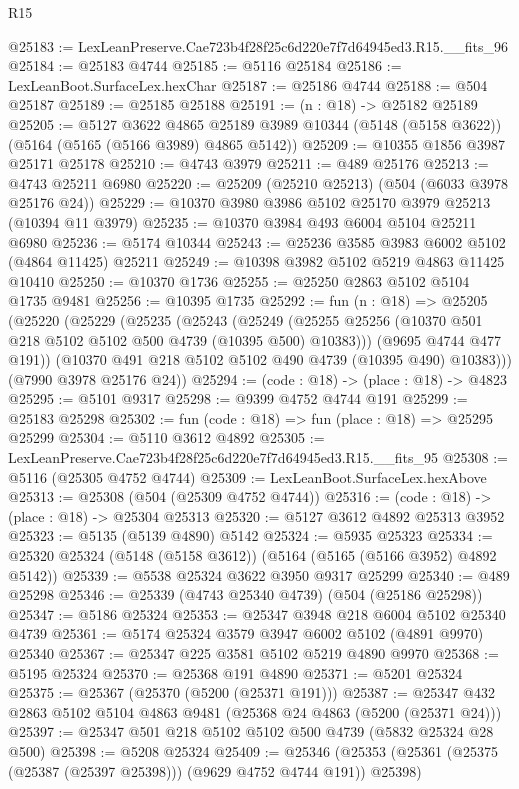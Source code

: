 \begin{lexlean}{R15}
\begin{coremodule}
{{{{{{{{{{{@25183 := LexLeanPreserve.Cae723b4f28f25c6d220e7f7d64945ed3.R15.__fits_96
@25184 := @25183 @4744
@25185 := @5116 @25184
@25186 := LexLeanBoot.SurfaceLex.hexChar
@25187 := @25186 @4744
@25188 := @504 @25187
@25189 := @25185 @25188
@25191 := (n : @18) -> @25182 @25189
@25205 := @5127
    @3622
    @4865
    @25189
    @3989
    @10344
    (@5148 (@5158 @3622))
    (@5164 (@5165 (@5166 @3989) @4865 @5142))
@25209 := @10355 @1856 @3987 @25171 @25178
@25210 := @4743 @3979
@25211 := @489 @25176
@25213 := @4743 @25211 @6980
@25220 := @25209 (@25210 @25213) (@504 (@6033 @3978 @25176 @24))
@25229 := @10370 @3980 @3986 @5102 @25170 @3979 @25213 (@10394 @11 @3979)
@25235 := @10370 @3984 @493 @6004 @5104 @25211 @6980
@25236 := @5174 @10344
@25243 := @25236 @3585 @3983 @6002 @5102 (@4864 @11425) @25211
@25249 := @10398 @3982 @5102 @5219 @4863 @11425 @10410
@25250 := @10370 @1736
@25255 := @25250 @2863 @5102 @5104 @1735 @9481
@25256 := @10395 @1735
@25292 := fun (n : @18) =>
  @25205
    (@25220
      (@25229
        (@25235
          (@25243
            (@25249 (@25255 @25256 (@10370 @501 @218 @5102 @5102 @500 @4739 (@10395 @500) @10383)))
            (@9695 @4744 @477 @191))
          (@10370 @491 @218 @5102 @5102 @490 @4739 (@10395 @490) @10383)))
      (@7990 @3978 @25176 @24))
@25294 := (code : @18) -> (place : @18) -> @4823
@25295 := @5101 @9317
@25298 := @9399 @4752 @4744 @191
@25299 := @25183 @25298
@25302 := fun (code : @18) => fun (place : @18) => @25295 @25299
@25304 := @5110 @3612 @4892
@25305 := LexLeanPreserve.Cae723b4f28f25c6d220e7f7d64945ed3.R15.__fits_95
@25308 := @5116 (@25305 @4752 @4744)
@25309 := LexLeanBoot.SurfaceLex.hexAbove
@25313 := @25308 (@504 (@25309 @4752 @4744))
@25316 := (code : @18) -> (place : @18) -> @25304 @25313
@25320 := @5127 @3612 @4892 @25313 @3952
@25323 := @5135 (@5139 @4890) @5142
@25324 := @5935 @25323
@25334 := @25320 @25324 (@5148 (@5158 @3612)) (@5164 (@5165 (@5166 @3952) @4892 @5142))
@25339 := @5538 @25324 @3622 @3950 @9317 @25299
@25340 := @489 @25298
@25346 := @25339 (@4743 @25340 @4739) (@504 (@25186 @25298))
@25347 := @5186 @25324
@25353 := @25347 @3948 @218 @6004 @5102 @25340 @4739
@25361 := @5174 @25324 @3579 @3947 @6002 @5102 (@4891 @9970) @25340
@25367 := @25347 @225 @3581 @5102 @5219 @4890 @9970
@25368 := @5195 @25324
@25370 := @25368 @191 @4890
@25371 := @5201 @25324
@25375 := @25367 (@25370 (@5200 (@25371 @191)))
@25387 := @25347 @432 @2863 @5102 @5104 @4863 @9481 (@25368 @24 @4863 (@5200 (@25371 @24)))
@25397 := @25347 @501 @218 @5102 @5102 @500 @4739 (@5832 @25324 @28 @500)
@25398 := @5208 @25324
@25409 := @25346 (@25353 (@25361 (@25375 (@25387 (@25397 @25398))) (@9629 @4752 @4744 @191)) @25398)
}}}}}}}}}}}
\end{coremodule}
\end{lexlean}
